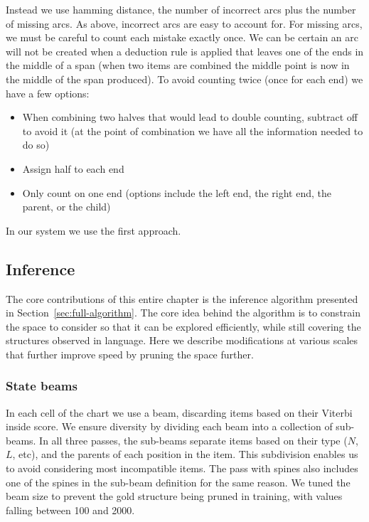 Instead we use hamming distance, the number of incorrect arcs plus the number of missing arcs.
As above, incorrect arcs are easy to account for.
For missing arcs, we must be careful to count each mistake exactly once.
We can be certain an arc will not be created when a deduction rule is applied that leaves one of the ends in the middle of a span (\myeg when two items are combined the middle point is now in the middle of the span produced).
To avoid counting twice (once for each end) we have a few options:

\begin{itemize}
  \item When combining two halves that would lead to double counting, subtract off to avoid it (at the point of combination we have all the information needed to do so)
  \item Assign half to each end
  \item Only count on one end (options include the left end, the right end, the parent, or the child)
\end{itemize}

\noindent
In our system we use the first approach.

\subsection{Inference} \label{sec:inference}

The core contributions of this entire chapter is the inference algorithm presented in Section~\ref{sec:full-algorithm}.
The core idea behind the algorithm is to constrain the space to consider so that it can be explored efficiently, while still covering the structures observed in language.
Here we describe modifications at various scales that further improve speed by pruning the space further.

\subsubsection{State beams}

In each cell of the chart we use a beam, discarding items based on their Viterbi inside score.
We ensure diversity by dividing each beam into a collection of sub-beams.
In all three passes, the sub-beams separate items based on their type ($N$, $L$, etc), and the parents of each position in the item.
This subdivision enables us to avoid considering most incompatible items.
The pass with spines also includes one of the spines in the sub-beam definition for the same reason.
We tuned the beam size to prevent the gold structure being pruned in training, with values falling between 100 and 2000.

